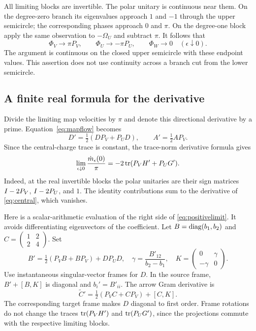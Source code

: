 All limiting blocks are invertible. The polar unitary is continuous
near them. On the degree-zero branch its eigenvalues approach $1$
and $-1$ through the upper semicircle; the corresponding phases approach
$0$ and $\pi$. On the degree-one block apply the same observation to
$-\Omega_U$ and subtract $\pi$. It follows that
\begin{equation}\label{eq:phaselimit}
 \Phi_V\longrightarrow\pi P_V,\qquad
 \Phi_U\longrightarrow-\pi P_U,\qquad
 \Phi_W\longrightarrow0
 \quad(\epsilon\downarrow0).
\end{equation}
The argument is continuous on the closed upper semicircle with these
endpoint values. This assertion does not use continuity across a branch
cut from the lower semicircle.

\subsection{A finite real formula for the derivative}
Divide the limiting map velocities by $\pi$ and denote this directional
derivative by a prime. Equation~\eqref{eq:mapflow} becomes
\begin{equation}\label{eq:realvelocity}
 D'=\tfrac12(DP_V+P_UD),\qquad A'=\tfrac12AP_V .
\end{equation}
Since the central-charge trace is constant, the trace-norm derivative
formula gives
\begin{equation}\label{eq:positivelimit}
 \lim_{\epsilon\downarrow0}\frac{\dot m_\epsilon(0)}{\pi}
 =-2\operatorname{tr}(P_VH'+P_UG').
\end{equation}
Indeed, at the real invertible blocks the polar unitaries are their
sign matrices $I-2P_V$, $I-2P_U$, and $1$.
The identity contributions sum to the derivative of \eqref{eq:central},
which vanishes.

Here is a scalar-arithmetic evaluation of the right side of
\eqref{eq:positivelimit}. It avoids differentiating eigenvectors of
the coefficient. Let $B=\operatorname{diag}(b_1,b_2)$ and
$C=\left(\begin{smallmatrix}1&2\\2&4\end{smallmatrix}\right)$.
Set
\begin{equation}\label{eq:Bprime}
 B'=\tfrac12(P_VB+BP_V)+DP_UD,\quad
 \gamma=\frac{B'_{12}}{b_2-b_1},\quad
 K=\begin{pmatrix}0&\gamma\\-\gamma&0\end{pmatrix}.
\end{equation}
Use instantaneous singular-vector frames for $D$.
In the source frame, $B'+[B,K]$ is diagonal and
$b_i'=B'_{ii}$. The arrow Gram derivative is
\begin{equation}\label{eq:Cprime}
 \widetilde C'=\tfrac12(P_VC+CP_V)+[C,K].
\end{equation}
The corresponding target frame makes $D$ diagonal to first order.
Frame rotations do not change the traces
$\operatorname{tr}(P_VH')$ and $\operatorname{tr}(P_UG')$, since the projections commute with
the respective limiting blocks.

